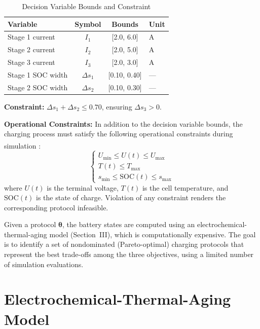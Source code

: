 \documentclass[lettersize,journal]{IEEEtran}
\let\OLDcite\cite
\renewcommand{\cite}[1]{\textsuperscript{\OLDcite{#1}}}
\begin{document}
\begin{table}[!t]
\caption{Decision Variable Bounds and Constraint}
\label{tab:variables}
\centering
\begin{tabular}{lccl}
\toprule
Variable & Symbol & Bounds & Unit \\
\midrule
Stage 1 current & $I_1$ & [2.0, 6.0] & A \\
Stage 2 current & $I_2$ & [2.0, 5.0] & A \\
Stage 3 current & $I_3$ & [2.0, 3.0] & A \\
Stage 1 SOC width & $\Delta s_1$ & [0.10, 0.40] & --- \\
Stage 2 SOC width & $\Delta s_2$ & [0.10, 0.30] & --- \\
\bottomrule
\end{tabular}
\vspace{2pt}

\noindent\textbf{Constraint:} $\Delta s_1 + \Delta s_2 \leq 0.70$, ensuring $\Delta s_3 > 0$.
\end{table}

\textbf{Operational Constraints:} In addition to the decision variable bounds, the charging process must satisfy the following operational constraints during simulation \cite{ref21}:
\begin{equation}
\label{eq:constraints}
\begin{cases}
U_{\min} \leq U(t) \leq U_{\max} \\
T(t) \leq T_{\max} \\
s_{\min} \leq \text{SOC}(t) \leq s_{\max}
\end{cases}
\end{equation}
where $U(t)$ is the terminal voltage, $T(t)$ is the cell temperature, and $\text{SOC}(t)$ is the state of charge. Violation of any constraint renders the corresponding protocol infeasible.

Given a protocol $\boldsymbol{\theta}$, the battery states are computed using an electrochemical-thermal-aging model (Section~III), which is computationally expensive. The goal is to identify a set of nondominated (Pareto-optimal) charging protocols that represent the best trade-offs among the three objectives, using a limited number of simulation evaluations.

\section{Electrochemical-Thermal-Aging Model}
\end{document}
